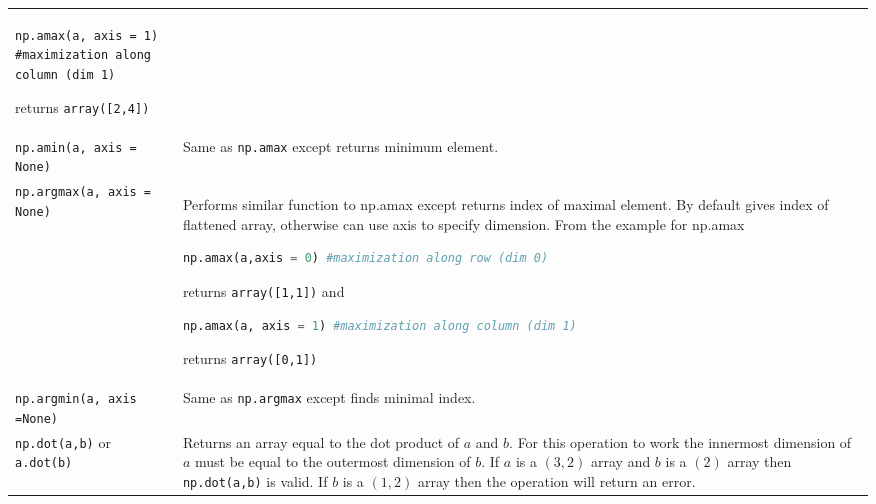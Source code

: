 \documentclass[]{article}
\begin{document}
\begin{longtable}[]{@{}ll@{}}
\begin{minipage}[t]{0.72\columnwidth}
\lstinline!np.amax(a, axis = 1) #maximization along column (dim 1)!

returns \lstinline!array([2,4])!\strut
\end{minipage}\tabularnewline
\begin{minipage}[t]{0.22\columnwidth}\raggedright\strut
\lstinline!np.amin(a, axis = None)!\strut
\end{minipage} & \begin{minipage}[t]{0.72\columnwidth}\raggedright\strut
Same as \lstinline!np.amax! except returns minimum element.\strut
\end{minipage}\tabularnewline
\begin{minipage}[t]{0.22\columnwidth}\raggedright\strut
\lstinline!np.argmax(a, axis = None)!\strut
\end{minipage} & \begin{minipage}[t]{0.72\columnwidth}\raggedright\strut
Performs similar function to np.amax except returns index of maximal
element. By default gives index of flattened array, otherwise can use
axis to specify dimension. From the example for np.amax

\begin{lstlisting}[language=Python]
np.amax(a,axis = 0) #maximization along row (dim 0)
\end{lstlisting}

returns \lstinline!array([1,1])! and

\begin{lstlisting}[language=Python]
np.amax(a, axis = 1) #maximization along column (dim 1)
\end{lstlisting}

returns \lstinline!array([0,1])!\strut
\end{minipage}\tabularnewline
\begin{minipage}[t]{0.22\columnwidth}\raggedright\strut
\lstinline!np.argmin(a, axis =None)!\strut
\end{minipage} & \begin{minipage}[t]{0.72\columnwidth}\raggedright\strut
Same as \lstinline!np.argmax! except finds minimal index.\strut
\end{minipage}\tabularnewline
\begin{minipage}[t]{0.22\columnwidth}\raggedright\strut
\lstinline!np.dot(a,b)! or \lstinline!a.dot(b)!\strut
\end{minipage} & \begin{minipage}[t]{0.72\columnwidth}\raggedright\strut
Returns an array equal to the dot product of \(a\) and \(b\). For this
operation to work the innermost dimension of \(a\) must be equal to the
outermost dimension of \(b\). If \(a\) is a \((3,2)\) array and \(b\) is
a \((2)\) array then \lstinline!np.dot(a,b)! is valid. If \(b\) is a
\((1,2)\) array then the operation will return an error.\strut
\end{minipage}\tabularnewline
\bottomrule
\end{longtable}
\end{document}
